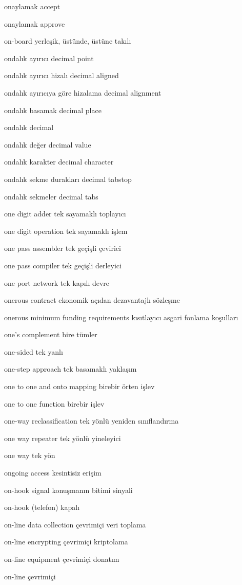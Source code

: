 \documentclass[12pt,fleqn]{article}\usepackage{../../common}
\begin{document}
onaylamak accept

onaylamak approve

on-board yerleşik, üstünde, üstüne takılı

ondalık ayırıcı decimal point

ondalık ayırıcı hizalı decimal aligned

ondalık ayırıcıya göre hizalama decimal alignment

ondalık basamak decimal place

ondalık decimal

ondalık değer decimal value

ondalık karakter decimal character

ondalık sekme durakları decimal tabstop

ondalık sekmeler decimal tabs

one digit adder tek sayamaklı toplayıcı

one digit operation tek sayamaklı işlem

one pass assembler tek geçişli çevirici

one pass compiler tek geçişli derleyici

one port network tek kapılı devre

onerous contract ekonomik açıdan dezavantajlı sözleşme

onerous minimum funding requirements kısıtlayıcı asgari fonlama koşulları

one's complement bire tümler

one-sided tek yanlı

one-step approach tek basamaklı yaklaşım

one to one and onto mapping birebir örten işlev

one to one function birebir işlev

one-way reclassification tek yönlü yeniden sınıflandırma

one way repeater tek yönlü yineleyici

one way tek yön

ongoing access kesintisiz erişim

on-hook signal konuşmanın bitimi sinyali

on-hook (telefon) kapalı

on-line data collection çevrimiçi veri toplama

on-line encrypting çevrimiçi kriptolama

on-line equipment çevrimiçi donatım

on-line çevrimiçi
\end{document}
